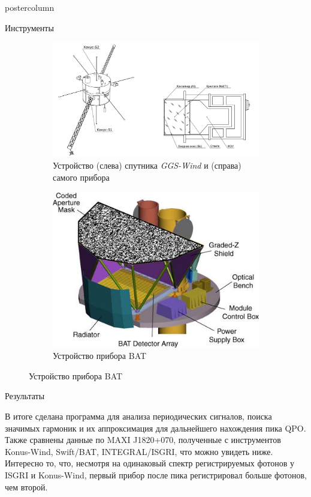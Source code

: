 \documentclass{beamer}
\begin{document}
\begin{frame}
\begin{columns}
\begin{column}{.57\textwidth}
\begin{beamercolorbox}[center]{postercolumn}
\begin{minipage}{.98\textwidth}
{\begin{myblock}{Инструменты}
						\begin{figure}[h!]
							\centering
							\begin{subfigure}[b]{0.59\linewidth}
								\includegraphics[width = \linewidth]{pictures/Konus-Wind.png}
								\caption{Устройство (слева) спутника \textit{GGS-Wind} и (справа) самого прибора}
							\end{subfigure}
							\begin{subfigure}[b]{0.38\linewidth}
								\includegraphics[width = \textwidth]{pictures/BAT.jpg}
								\caption{Устройство прибора BAT}
							\end{subfigure}
						\end{figure}

					\end{myblock}\vfill
					\begin{myblock}{Результаты}
					
						В итоге сделана программа для анализа периодических сигналов, поиска значимых гармоник и их аппроксимация для дальнейшего нахождения пика QPO. Также сравнены данные по MAXI J1820+070, полученные с инструментов Konus-Wind, Swift/BAT, INTEGRAL/ISGRI, что можно увидеть ниже. Интересно то, что, несмотря на одинаковый спектр регистрируемых фотонов у ISGRI и Konus-Wind, первый прибор после пика регистрировал больше фотонов, чем второй.
	

\end{myblock}}
\end{minipage}
\end{beamercolorbox}
\end{column}
\end{columns}
\end{frame}
\end{document}
